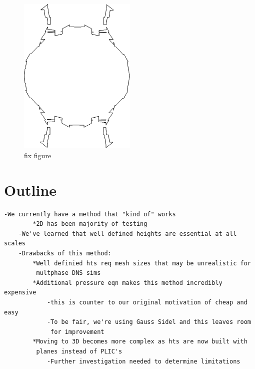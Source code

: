  \begin{figure}
	\centering
	\includegraphics[width=0.5\textwidth]{figs/bad.png}
	\caption{fix figure}
	\label{fig:45s}
\end{figure}

\section{Outline}
\begin{Verbatim}[tabsize=4]
	-We currently have a method that "kind of" works
		*2D has been majority of testing
	-We've learned that well defined heights are essential at all scales
	-Drawbacks of this method:
		*Well definied hts req mesh sizes that may be unrealistic for 
		 multphase DNS sims
		*Additional pressure eqn makes this method incredibly expensive 
			-this is counter to our original motivation of cheap and easy
			-To be fair, we're using Gauss Sidel and this leaves room 
			 for improvement
		*Moving to 3D becomes more complex as hts are now built with
		 planes instead of PLIC's
			-Further investigation needed to determine limitations
\end{Verbatim}